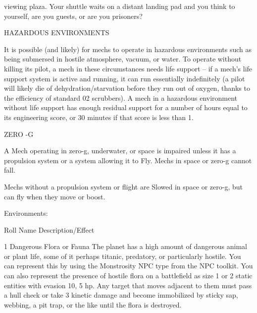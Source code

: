     viewing plaza. Your shuttle waits on a distant landing pad and you think to yourself, are
    you guests, or are you prisoners?




HAZARDOUS ENVIRONMENTS

It is possible (and likely) for mechs to operate in hazardous environments such as being
submersed in hostile atmosphere, vacuum, or water. To operate without killing its pilot, a mech in
these circumstances needs life support -- if a mech's life support system is active and running,
it can run essentially indefinitely (a pilot will likely die of dehydration/starvation before they run
out of oxygen, thanks to the efficiency of standard 02 scrubbers). A mech in a hazardous
environment without life support has enough residual support for a number of hours equal to its
engineering score, or 30 minutes if that score is less than 1.


                                                 ZERO -G

A Mech operating in zero-g, underwater, or space is impaired unless it has a propulsion system
or a system allowing it to Fly. Mechs in space or zero-g cannot fall.


Mechs without a propulsion system or flight are Slowed in space or zero-g, but can fly when
they move or boost.


                                              Environments:


 Roll    Name                                Description/Effect

 1       Dangerous Flora or Fauna            The planet has a high amount of dangerous animal or
                                             plant life, some of it perhaps titanic, predatory, or
                                             particularly hostile. You can represent this by using the
                                             Monstrosity NPC type from the NPC toolkit. You can
                                             also represent the presence of hostile flora on a
                                             battlefield as size 1 or 2 static entities with evasion 10,
                                             5 hp. Any target that moves adjacent to them must
                                             pass a hull check or take 3 kinetic damage and become
                                             immobilized by sticky sap, webbing, a pit trap, or the
                                             like until the flora is destroyed.

